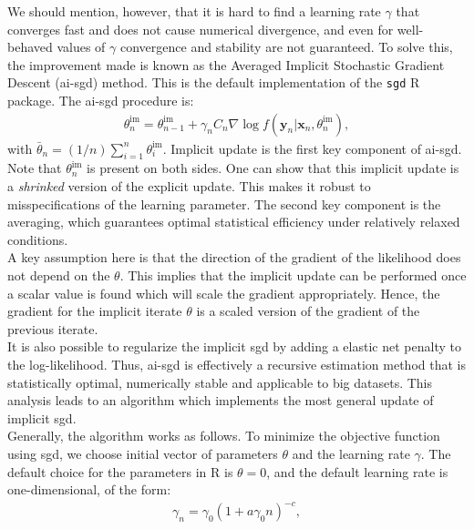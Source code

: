 \documentclass[a4paper, 11pt]{article}
\begin{document}
\newline We should mention, however, that it is hard to find a learning rate $\gamma$ that converges fast and does not cause numerical divergence, and even for well-behaved values of $\gamma$ convergence and stability are not guaranteed. To solve this, the improvement made is known as the Averaged Implicit Stochastic Gradient Descent ({\sc ai-{\sc sgd}}) method. This is the default implementation of the \texttt{sgd} R package. The {\sc ai-{\sc sgd}} procedure is:
\begin{eqnarray}
\theta_{n}^{\text{im}} = \theta_{n-1}^{\text{im}} + \gamma_n C_n \nabla \log f(\mathbf{y}_n | \mathbf{x}_n, \theta_{n}^{\text{im}}), \nonumber
\end{eqnarray}
with $\bar{\theta}_n = (1/n) \sum_{i=1}^{n} \theta_{i}^{\text{im}}$. Implicit update is the first key component of {\sc ai-{\sc sgd}}. Note that $\theta_{n}^{\text{im}}$ is present on both sides. One can show that this implicit update is a \textit{shrinked} version of the explicit update. This makes it robust to misspecifications of the learning parameter. The second key component is the averaging, which guarantees optimal statistical efficiency under relatively relaxed conditions.\\
\newline A key assumption here is that the direction of the gradient of the likelihood does not depend on the $\theta$. This implies that the implicit update can be performed once a scalar value is found which will scale the gradient appropriately. Hence, the gradient for the implicit iterate $\theta$ is a scaled version of the gradient of the previous iterate.\\
\newline It is also possible to regularize the implicit {\sc sgd} by adding a elastic net penalty to the log-likelihood. Thus, {\sc ai-{\sc sgd}} is effectively a recursive estimation method that is statistically optimal, numerically stable and applicable to big datasets. This analysis leads to an algorithm which implements the most general update of implicit {\sc sgd}.\\
\newline Generally, the algorithm works as follows. To minimize the objective function using {\sc sgd}, we choose initial vector of parameters $\theta$ and the learning rate $\gamma$. The default choice for the parameters in R is $\theta = 0$, and the default learning rate is one-dimensional, of the form:
\begin{eqnarray}
\gamma_n = \gamma_0 (1 + a \gamma_0 n)^{−c}, \nonumber
\end{eqnarray}
\end{document}
